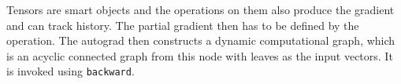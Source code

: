 \begin{exercise}[Backpropagate]

\end{exercise}


\begin{exercise}[PyTorch]
Tensors are smart objects and the operations on them also produce the gradient and can track history. The partial gradient then has to be defined by the operation. The autograd then constructs a dynamic computational graph, which is an acyclic connected graph from this node with leaves as the input vectors. It is invoked using \texttt{backward}.
\end{exercise}


